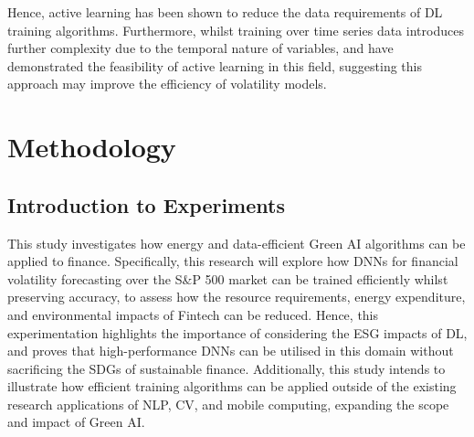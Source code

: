 \documentclass[a4paper, 11pt]{report}
\begin{document}
    Hence, active learning has been shown to reduce the data requirements of DL training algorithms. Furthermore, whilst training over time series data introduces further complexity due to the temporal nature of variables, \citet{peng-2017} and \citet{zimmer-2018} have demonstrated the feasibility of active learning in this field, suggesting this approach may improve the efficiency of volatility models.


    \newpage
    \chapter{Methodology}
    \label{chapter: experiments}

    \section{Introduction to Experiments}

    This study investigates how energy and data-efficient Green AI algorithms can be applied to finance. Specifically, this research will explore how DNNs for financial volatility forecasting over the S\&P 500 market can be trained efficiently whilst preserving accuracy, to assess how the resource requirements, energy expenditure, and environmental impacts of Fintech can be reduced. Hence, this experimentation highlights the importance of considering the ESG impacts of DL, and proves that high-performance DNNs can be utilised in this domain without sacrificing the SDGs of sustainable finance. Additionally, this study intends to illustrate how efficient training algorithms can be applied outside of the existing research applications of NLP, CV, and mobile computing, expanding the scope and impact of Green AI.
\end{document}
